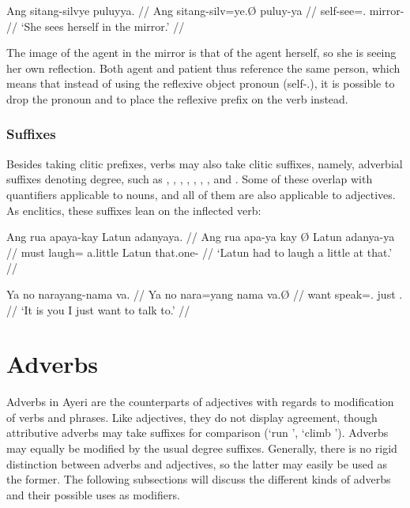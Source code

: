 \ex\begingl
	\gla Ang sitang-silvye puluyya. //
	\glb Ang sitang-silv=ye.Ø puluy-ya //
	\glc \AgtT{} self-see=\TsgF{}.\Top{} mirror-\Loc{} //
	\glft `She sees herself in the mirror.' //
\endgl\xe

The image of the agent in the mirror is that of the agent herself, so she is
seeing her own reflection. Both agent and patient thus reference the same
person, which means that instead of using the reflexive object pronoun
 (self-\TsgF{}.\Parg{}), it is possible
to drop the pronoun and to place the reflexive prefix on the verb instead.

\subsubsection{Suffixes}
Besides taking clitic prefixes, verbs may also take clitic suffixes, namely, 
adverbial suffixes denoting degree, such as , 
, , 
, , 
, , and 
. Some of these overlap with quantifiers applicable 
to nouns, and all of them are also applicable to adjectives. As enclitics, 
these suffixes lean on the inflected verb:

\pex
\a\label{ex:verbquant}\begingl
	\gla Ang rua apaya-kay {} Latun adanyaya. //
	\glb Ang rua {apa-ya kay} Ø Latun adanya-ya //
	\glc \AgtT{} must {laugh=\TsgM{} a.little} \Top{} Latun that.one-\Loc{} //
	\glft `Latun had to laugh a little at that.' //
\endgl

\a\begingl
	\gla Ya no narayang-nama va. //
	\glb Ya no {nara=yang nama} va.Ø //
	\glc \LocT{} want {speak=\Fsg{}.\Aarg{} just} \Ssg{}.\Top{} //
	\glft `It is you I just want to talk to.' //
\endgl
\xe


\section{Adverbs}
\label{sec:adverbs}

Adverbs in Ayeri are the counterparts of adjectives with regards to
modification of verbs and phrases. Like adjectives, they do not display
agreement, though attributive adverbs may take suffixes for comparison (`run
', `climb '). Adverbs may equally be modified by the
usual degree suffixes. Generally, there is no rigid distinction between adverbs
and adjectives, so the latter may easily be used as the former. The following
subsections will discuss the different kinds of adverbs and their possible uses
as modifiers.

